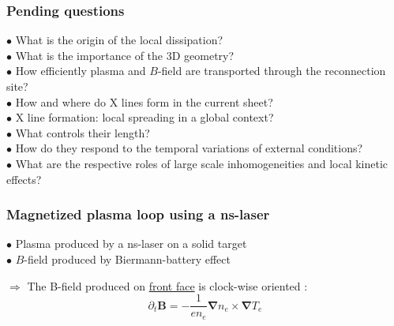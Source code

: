 \documentclass{beamer}
\begin{document}
\begin{frame}
\frametitle{Pending questions}

$\bullet$ What is the origin of the local dissipation? \\[0.3cm]
$\bullet$ What is the importance of the 3D geometry? \\[0.3cm]
$\bullet$ How efficiently plasma and $B$-field are transported through the reconnection site? \\[0.3cm]
$\bullet$ How and where do X lines form in the current sheet? \\[0.3cm]
$\bullet$ X line formation: local spreading in a global context? \\[0.3cm]
$\bullet$ What controls their length? \\[0.3cm]
$\bullet$ How do they respond to the temporal variations of external conditions? \\[0.3cm]
$\bullet$ What are the respective roles of large scale inhomogeneities and local kinetic effects? \\[0.3cm]

\end{frame}



\begin{frame}
\frametitle{Magnetized plasma loop using a ns-laser}

$\bullet$ Plasma produced by a ns-laser on a solid target \\
$\bullet$ $B$-field produced by Biermann-battery effect

\begin{center}

\end{center}

$\Rightarrow$ The B-field produced on \underline{front face} is clock-wise oriented :
$$
\partial_t \mathbf B = - \frac{1}{en_e} \boldsymbol{\nabla} n_e \times \boldsymbol{\nabla} T_e
$$

\end{frame}
\end{document}
